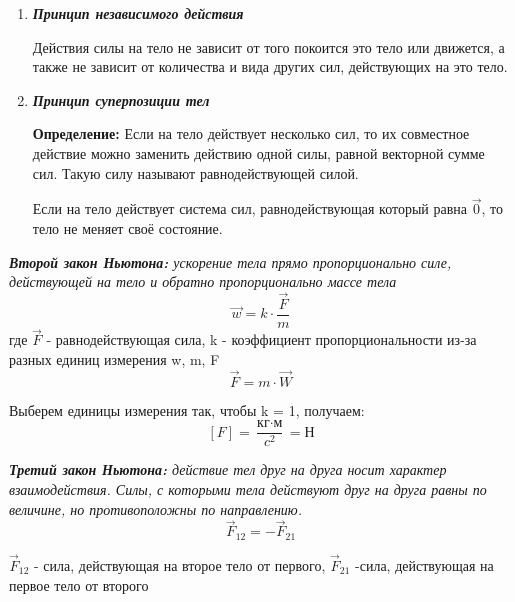 \begin{enumerate}
    \item \textbf{\textit{Принцип независимого действия }}

          Действия силы на тело не зависит от того покоится это тело или движется, а также не зависит от количества и вида других сил, действующих на это тело.
          \newpage
    \item \textbf{\textit{Принцип суперпозиции тел}}

          \textbf{Определение:} Если на тело действует несколько сил, то их совместное действие можно заменить действию одной силы, равной векторной сумме сил. Такую силу называют равнодействующей силой.

          Если на тело действует система сил, равнодействующая который равна $\vec 0$, то тело не меняет своё состояние.
\end{enumerate}
\textit{\textbf{Второй закон Ньютона:} ускорение тела прямо пропорционально силе, действующей на тело и обратно пропорционально массе тела} \[ \vec w = k \cdot \frac{\vec F}{m} \] где $\vec F$ - равнодействующая сила, k - коэффициент пропорциональности из-за разных единиц измерения w, m, F
\[ \vec F = m \cdot \vec W\]

Выберем единицы измерения так, чтобы k = 1, получаем:
\[[F] = \frac{\text{кг}\cdot\text{м}}{c^2} = \text{Н}\]

\textit{\textbf{Третий закон Ньютона:} действие тел друг на друга носит характер взаимодействия. Силы, с которыми тела действуют друг на друга равны по величине, но противоположны по направлению.}
\[\vec F_{12} = - \vec F_{21}\]

$\vec F_{12}$ - сила, действующая на второе тело от первого, $\vec F_{21}$ -сила, действующая на первое тело от второго
